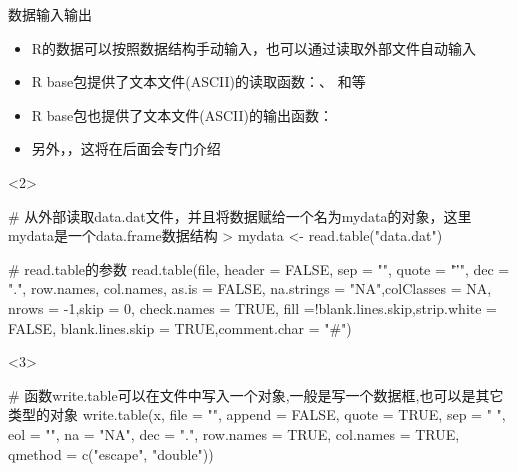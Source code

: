 \documentclass{beamerthemeMono}
\begin{document}
\begin{frame}[t,fragile]{\subsecname}{数据输入输出}
  \begin{itemize}
     \item R的数据可以按照数据结构手动输入，也可以通过读取外部文件自动输入
     \item R base包提供了文本文件(ASCII)的读取函数：、
                     和等
     \item R base包也提供了文本文件(ASCII)的输出函数：
     \item 另外，，这将在后面会专门介绍
  \end{itemize}

\begin{overlayarea}{\textwidth}{\textheight}
\begin{onlyenv}<2>
\begin{rcode}
# 从外部读取data.dat文件，并且将数据赋给一个名为mydata的对象，这里mydata是一个data.frame数据结构
> mydata <- read.table("data.dat")

# read.table的参数
read.table(file, header = FALSE, sep = "", quote = "\"’", dec = ".", row.names, col.names, as.is = FALSE, na.strings = "NA",colClasses = NA, nrows = -1,skip = 0, check.names = TRUE, fill =!blank.lines.skip,strip.white = FALSE, blank.lines.skip = TRUE,comment.char = "#")
\end{rcode}
\end{onlyenv}

\begin{onlyenv}<3>
\begin{rcode}
# 函数write.table可以在文件中写入一个对象,一般是写一个数据框,也可以是其它类型的对象
write.table(x, file = "", append = FALSE, quote = TRUE, sep = " ", eol = "\n", na = "NA", dec = ".", row.names = TRUE, col.names = TRUE, qmethod = c("escape", "double"))
\end{rcode}
\end{onlyenv}

\end{overlayarea}
\end{frame}
\end{document}
